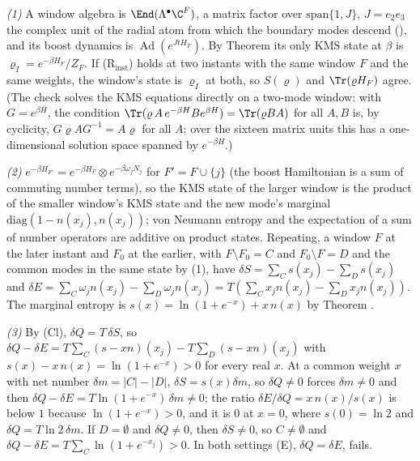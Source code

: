 \emph{(1)} A window algebra is $\End(\Lambda^\bullet\C^F)$, a matrix factor over $\mathrm{span}\{1, J\}$, $J = e_2e_3$ the complex unit of the radial atom from which the boundary modes descend (), and its boost dynamics is $\operatorname{Ad}(e^{JtH_F})$. By Theorem  its only KMS state at $\beta$ is $\varrho_I = e^{-\beta H_F}/Z_F$. If (R$_{\mathrm{inst}}$) holds at two instants with the same window $F$ and the same weights, the window's state is $\varrho_I$ at both, so $S(\varrho)$ and $\Tr(\varrho H_F)$ agree. (The check solves the KMS equations directly on a two-mode window: with $G = e^{\beta H}$, the condition $\Tr(\varrho\,A\,e^{-\beta H}Be^{\beta H}) = \Tr(\varrho BA)$ for all $A, B$ is, by cyclicity, $G\varrho A G^{-1} = A\varrho$ for all $A$; over the sixteen matrix units this has a one-dimensional solution space spanned by $e^{-\beta H}$.)

\emph{(2)} $e^{-\beta H_{F'}} = e^{-\beta H_F}\otimes e^{-\beta\omega_j N_j}$ for $F' = F \cup \{j\}$ (the boost Hamiltonian is a sum of commuting number terms), so the KMS state of the larger window is the product of the smaller window's KMS state and the new mode's marginal $\mathrm{diag}(1 - n(x_j), n(x_j))$; von Neumann entropy and the expectation of a sum of number operators are additive on product states. Repeating, a window $F$ at the later instant and $F_0$ at the earlier, with $F \setminus F_0 = C$ and $F_0 \setminus F = D$ and the common modes in the same state by (1), have $\delta S = \sum_C s(x_j) - \sum_D s(x_j)$ and $\delta E = \sum_C\omega_j n(x_j) - \sum_D\omega_j n(x_j) = T(\sum_C x_j n(x_j) - \sum_D x_j n(x_j))$. The marginal entropy is $s(x) = \ln(1 + e^{-x}) + x\,n(x)$ by Theorem .

\emph{(3)} By (Cl), $\delta Q = T\,\delta S$, so $\delta Q - \delta E = T\sum_C(s - xn)(x_j) - T\sum_D(s - xn)(x_j)$ with $s(x) - x\,n(x) = \ln(1 + e^{-x}) > 0$ for every real $x$. At a common weight $x$ with net number $\delta m = |C| - |D|$, $\delta S = s(x)\delta m$, so $\delta Q \neq 0$ forces $\delta m \neq 0$ and then $\delta Q - \delta E = T\ln(1 + e^{-x})\,\delta m \neq 0$; the ratio $\delta E/\delta Q = x\,n(x)/s(x)$ is below $1$ because $\ln(1 + e^{-x}) > 0$, and it is $0$ at $x = 0$, where $s(0) = \ln 2$ and $\delta Q = T\ln 2\,\delta m$. If $D = \emptyset$ and $\delta Q \neq 0$, then $\delta S \neq 0$, so $C \neq \emptyset$ and $\delta Q - \delta E = T\sum_C\ln(1 + e^{-x_j}) > 0$. In both settings (E), $\delta Q = \delta E$, fails.

